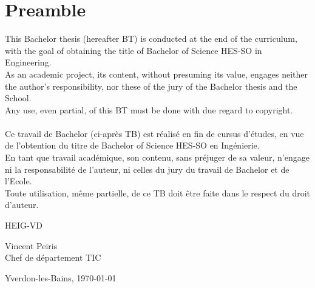 \hspace{0pt}
\vfill
\section{Preamble}

This Bachelor thesis (hereafter BT) is conducted at the end of the curriculum, with the goal of obtaining the title of Bachelor of Science HES-SO in Engineering.\\

As an academic project, its content, without presuming its value, engages neither the author's responsibility, nor these of the jury of the Bachelor thesis and the School.\\

Any use, even partial, of this BT must be done with due regard to copyright.\\\\

Ce travail de Bachelor (ci-après TB) est réalisé en fin de cursus d’études, en vue de l'obtention du titre de Bachelor of Science HES-SO en Ingénierie. \\

En tant que travail académique, son contenu, sans préjuger de sa valeur, n'engage ni la responsabilité de l'auteur, ni celles du jury du travail de Bachelor et de l'Ecole. \\

Toute utilisation, même partielle, de ce TB doit être faite dans le respect du droit d’auteur. \\

\begin{flushright}
    \begin{minipage}{7cm}
        \vspace{2cm}
        HEIG-VD \\

        \vspace{2cm}

        Vincent Peiris\\
        Chef de département TIC
    \end{minipage}\hfill
\end{flushright}

\vspace{2.5cm}

Yverdon-les-Bains, \today
\vfill
\hspace{0pt}
